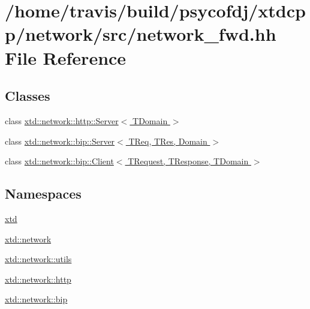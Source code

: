 \hypertarget{network__fwd_8hh}{\section{/home/travis/build/psycofdj/xtdcpp/network/src/network\-\_\-fwd.hh File Reference}
\label{network__fwd_8hh}
}
\subsection*{Classes}
\begin{DoxyCompactItemize}
\item 
class \hyperlink{classxtd_1_1network_1_1http_1_1Server}{xtd\-::network\-::http\-::\-Server$<$ T\-Domain $>$}
\begin{DoxyCompactList}\small\item\em \par
\par
 \end{DoxyCompactList}\item 
class \hyperlink{classxtd_1_1network_1_1bip_1_1Server}{xtd\-::network\-::bip\-::\-Server$<$ T\-Req, T\-Res, Domain $>$}
\item 
class \hyperlink{classxtd_1_1network_1_1bip_1_1Client}{xtd\-::network\-::bip\-::\-Client$<$ T\-Request, T\-Response, T\-Domain $>$}
\end{DoxyCompactItemize}
\subsection*{Namespaces}
\begin{DoxyCompactItemize}
\item 
\hyperlink{namespacextd}{xtd}
\item 
\hyperlink{namespacextd_1_1network}{xtd\-::network}
\item 
\hyperlink{namespacextd_1_1network_1_1utils}{xtd\-::network\-::utils}
\item 
\hyperlink{namespacextd_1_1network_1_1http}{xtd\-::network\-::http}
\item 
\hyperlink{namespacextd_1_1network_1_1bip}{xtd\-::network\-::bip}
\end{DoxyCompactItemize}
